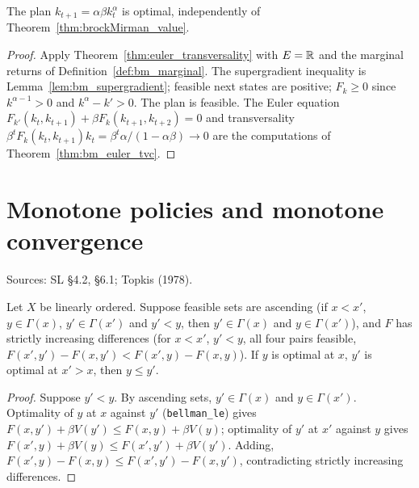\begin{theorem}
\label{thm:brockMirman_optimal_of_euler}
\leanok
{}
The plan $k_{t+1} = \alpha\beta k_t^\alpha$ is optimal, independently of Theorem~\ref{thm:brockMirman_value}.
\end{theorem}
\begin{proof}
\leanok
Apply Theorem~\ref{thm:euler_transversality} with $E = \mathbb{R}$ and the marginal returns of
Definition~\ref{def:bm_marginal}. The supergradient inequality is Lemma~\ref{lem:bm_supergradient};
feasible next states are positive; $F_k \ge 0$ since $k^{\alpha-1} > 0$ and $k^\alpha - k' > 0$. The plan is
feasible. The Euler equation $F_{k'}(k_t, k_{t+1}) + \beta F_k(k_{t+1}, k_{t+2}) = 0$ and transversality
$\beta^t F_k(k_t, k_{t+1}) k_t = \beta^t \alpha/(1-\alpha\beta) \to 0$ are the computations of
Theorem~\ref{thm:bm_euler_tvc}.
\end{proof}

\section{Monotone policies and monotone convergence}
\label{sec:dp_monotone}

Sources: SL \S4.2, \S6.1; Topkis (1978).

\begin{theorem}
\label{thm:policy_monotone}
\leanok
{}
Let $X$ be linearly ordered. Suppose feasible sets are ascending (if $x < x'$, $y \in \Gamma(x)$, $y' \in \Gamma(x')$
and $y' < y$, then $y' \in \Gamma(x)$ and $y \in \Gamma(x')$), and $F$ has strictly increasing differences (for
$x < x'$, $y' < y$, all four pairs feasible, $F(x', y') - F(x, y') < F(x', y) - F(x, y)$). If $y$ is optimal at $x$,
$y'$ is optimal at $x' > x$, then $y \le y'$.
\end{theorem}
\begin{proof}
\leanok
Suppose $y' < y$. By ascending sets, $y' \in \Gamma(x)$ and $y \in \Gamma(x')$. Optimality of $y$ at $x$ against $y'$
(\texttt{bellman\_le}) gives $F(x, y') + \beta V(y') \le F(x, y) + \beta V(y)$; optimality of $y'$ at $x'$ against
$y$ gives $F(x', y) + \beta V(y) \le F(x', y') + \beta V(y')$. Adding, $F(x', y) - F(x, y) \le F(x', y') - F(x, y')$,
contradicting strictly increasing differences.
\end{proof}

